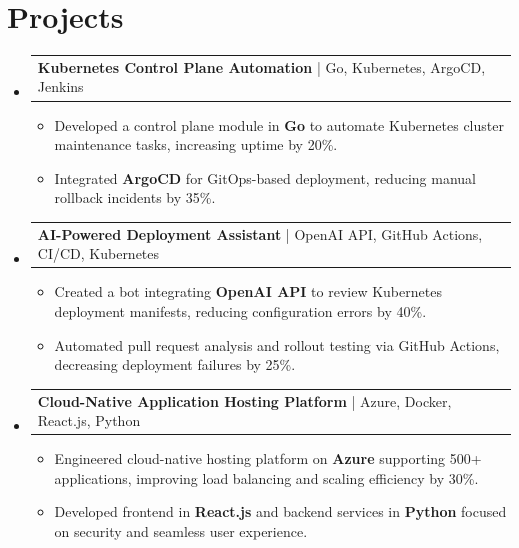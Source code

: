 \documentclass[letterpaper,11pt]{article}
\makeatletter
\newcommand{\resumeItem}[1]{
  \item\footnotesize{
    {#1 \vspace{-2pt}}
  }
}
\newcommand{\resumeProjectHeading}[2]{
    \item
    \begin{tabular*}{1.001\textwidth}{l@{\extracolsep{\fill}}r}
      \small#1 & \textbf{\small #2}\\
    \end{tabular*}\vspace{-7pt}
}
\newcommand{\resumeSubHeadingListStart}{\begin{itemize}[leftmargin=0pt, label={}]}
\newcommand{\resumeSubHeadingListEnd}{\end{itemize}}
\newcommand{\resumeItemListStart}{\begin{itemize}[leftmargin=*]}
\newcommand{\resumeItemListEnd}{\end{itemize}\vspace{-5pt}}
\makeatother
\begin{document}
\section{Projects}
    \vspace{-5pt}
    \resumeSubHeadingListStart
      \resumeProjectHeading
          {\textbf{Kubernetes Control Plane Automation} | Go, Kubernetes, ArgoCD, Jenkins}{}
          \resumeItemListStart
              \resumeItem{Developed a control plane module in \textbf{Go} to automate Kubernetes cluster maintenance tasks, increasing uptime by 20\%.}
              \resumeItem{Integrated \textbf{ArgoCD} for GitOps-based deployment, reducing manual rollback incidents by 35\%.}
          \resumeItemListEnd
          \vspace{-12pt}
      \resumeProjectHeading
          {\textbf{AI-Powered Deployment Assistant} | OpenAI API, GitHub Actions, CI/CD, Kubernetes}{}
          \resumeItemListStart
              \resumeItem{Created a bot integrating \textbf{OpenAI API} to review Kubernetes deployment manifests, reducing configuration errors by 40\%.}
              \resumeItem{Automated pull request analysis and rollout testing via GitHub Actions, decreasing deployment failures by 25\%.}
          \resumeItemListEnd
          \vspace{-12pt}
      \resumeProjectHeading
          {\textbf{Cloud-Native Application Hosting Platform} | Azure, Docker, React.js, Python}{}
          \resumeItemListStart
              \resumeItem{Engineered cloud-native hosting platform on \textbf{Azure} supporting 500+ applications, improving load balancing and scaling efficiency by 30\%.}
              \resumeItem{Developed frontend in \textbf{React.js} and backend services in \textbf{Python} focused on security and seamless user experience.}
          \resumeItemListEnd 
    \resumeSubHeadingListEnd
\end{document}
